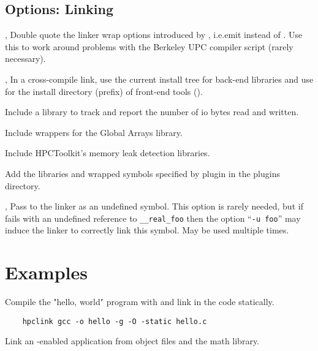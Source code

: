 \documentclass[english]{article}
\begin{document}
\subsection{Options: Linking}

\begin{Description}

\item[\Opt{-dw}, \Opt{--double-wrap}]
Double quote the linker wrap options introduced by ,
i.e.emit  instead of .
Use this to work around problems with the Berkeley UPC compiler script (rarely necessary).

\item[\OptArg{-fe}{dir}, \OptArg{--front-end}{dir}]
In a cross-compile link,
use the current install tree for back-end libraries and
use  for the install directory (prefix) of front-end tools ().

\item[\Opt{--io}]
Include a library to track and report the number of io bytes read and written.

\item[\Opt{--ga}]
Include wrappers for the Global Arrays library.

\item[\Opt{--memleak}]
Include HPCToolkit's memory leak detection libraries.

\item[\OptArg{--plugin}{name}]
Add the libraries and wrapped symbols specified by plugin  in the plugins directory.

\item[\OptArg{-u}{symbol}, \OptArg{--undefined}{symbol}]
Pass  to the linker as an undefined symbol.
This option is rarely needed,
but if  fails with an undefined reference to \texttt{\_\_real\_foo}
then the option ``\texttt{-u foo}'' may induce the linker to correctly link this symbol.
May be used multiple times.

\end{Description}


\section{Examples}

Compile the "hello, world" program with  and link in the
 code statically.

\begin{verbatim}
    hpclink gcc -o hello -g -O -static hello.c
\end{verbatim}
%
Link an -enabled application from object files and the
math library.
\end{document}

